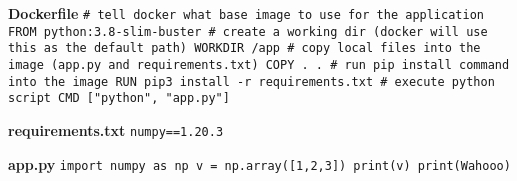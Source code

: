 \textbf{Dockerfile}\newline
\texttt{\# tell docker what base image to use for the application\newline
FROM python:3.8-slim-buster\newline
\newline
\# create a working dir (docker will use this as the default path)\newline
WORKDIR /app\newline
\newline
\# copy local files into the image (app.py and requirements.txt)\newline
COPY . .\newline
\newline
\# run pip install command into the image\newline
RUN pip3 install -r requirements.txt\newline
\newline
\# execute python script\newline
CMD ["python", "app.py"]}\newline

\textbf{requirements.txt}\newline
\texttt{numpy==1.20.3}\newline

\textbf{app.py}\newline
\texttt{import numpy as np\newline
v = np.array([1,2,3])\newline
print(v)\newline
print(\textquotesingle Wahooo\textquotesingle)}

\newpage
